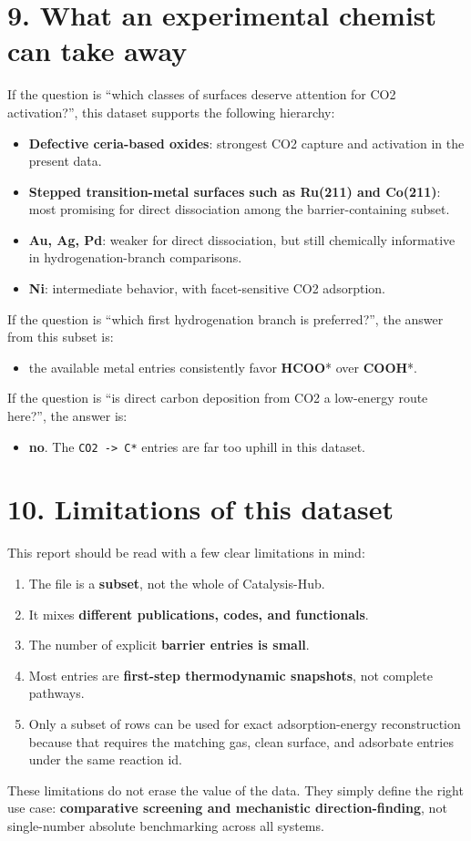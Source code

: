 \documentclass[11pt]{article}
\begin{document}
\section{9. What an experimental chemist can take away}
If the question is ``which classes of surfaces deserve attention for CO2 activation?'', this dataset supports the following hierarchy:
\begin{itemize}
\item \textbf{Defective ceria-based oxides}: strongest CO2 capture and activation in the present data.
\item \textbf{Stepped transition-metal surfaces such as Ru(211) and Co(211)}: most promising for direct dissociation among the barrier-containing subset.
\item \textbf{Au, Ag, Pd}: weaker for direct dissociation, but still chemically informative in hydrogenation-branch comparisons.
\item \textbf{Ni}: intermediate behavior, with facet-sensitive CO2 adsorption.
\end{itemize}
If the question is ``which first hydrogenation branch is preferred?'', the answer from this subset is:
\begin{itemize}
\item the available metal entries consistently favor \textbf{HCOO}* over \textbf{COOH}*.
\end{itemize}
If the question is ``is direct carbon deposition from CO2 a low-energy route here?'', the answer is:
\begin{itemize}
\item \textbf{no}. The \texttt{CO2 -> C*} entries are far too uphill in this dataset.
\end{itemize}
\section{10. Limitations of this dataset}
This report should be read with a few clear limitations in mind:
\begin{enumerate}
\item The file is a \textbf{subset}, not the whole of Catalysis-Hub.
\item It mixes \textbf{different publications, codes, and functionals}.
\item The number of explicit \textbf{barrier entries is small}.
\item Most entries are \textbf{first-step thermodynamic snapshots}, not complete pathways.
\item Only a subset of rows can be used for exact adsorption-energy reconstruction because that requires the matching gas, clean surface, and adsorbate entries under the same reaction id.
\end{enumerate}
These limitations do not erase the value of the data. They simply define the right use case: \textbf{comparative screening and mechanistic direction-finding}, not single-number absolute benchmarking across all systems.
\end{document}
